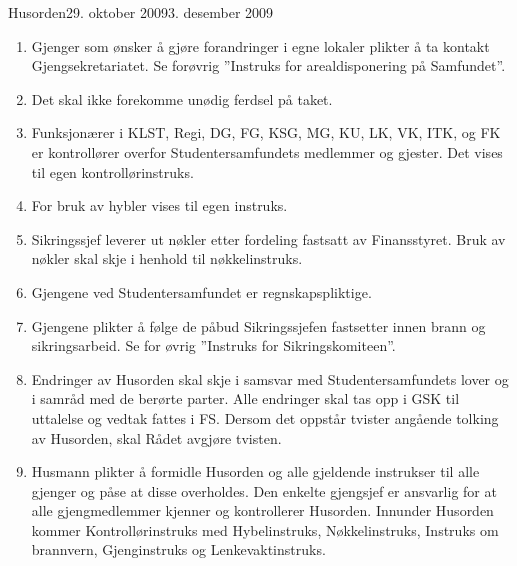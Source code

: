 \begin{instruks}{Husorden}{29. oktober 2009}{3. desember 2009}
\begin{enumerate}
            egne regler/instrukser.
            Disse skal godkjennes av Finansstyret.
        \item Gjenger som ønsker å gjøre forandringer i egne lokaler plikter å ta kontakt
            Gjengsekretariatet. Se forøvrig
            ”Instruks for arealdisponering på Samfundet”.
        \item Det skal ikke forekomme unødig ferdsel på taket.
        \item Funksjonærer i KLST, Regi, DG, FG, KSG, MG, KU, LK, VK, ITK, og FK er
            kontrollører overfor Studentersamfundets medlemmer og gjester. Det vises til egen
            kontrollørinstruks.
        \item For bruk av hybler vises til egen instruks.
        \item Sikringssjef leverer ut nøkler etter fordeling fastsatt av Finansstyret. Bruk
            av nøkler skal skje i henhold til
            nøkkelinstruks.
        \item Gjengene ved Studentersamfundet er regnskapspliktige.
        \item Gjengene plikter å følge de påbud Sikringssjefen fastsetter innen brann og
            sikringsarbeid. Se for øvrig
            ”Instruks for Sikringskomiteen”.
        \item Endringer av Husorden skal skje i samsvar med Studentersamfundets lover og i
            samråd med de berørte
            parter. Alle endringer skal tas opp i GSK til uttalelse og vedtak fattes i FS.
            Dersom det oppstår tvister
            angående tolking av Husorden, skal Rådet avgjøre tvisten.
        \item Husmann plikter å formidle Husorden og alle gjeldende instrukser til alle
            gjenger og påse at disse
            overholdes. Den enkelte gjengsjef er ansvarlig for at alle gjengmedlemmer
            kjenner og kontrollerer
            Husorden. Innunder Husorden kommer Kontrollørinstruks med Hybelinstruks,
            Nøkkelinstruks, Instruks
            om brannvern, Gjenginstruks og Lenkevaktinstruks.
    \end{enumerate}
\end{instruks}


